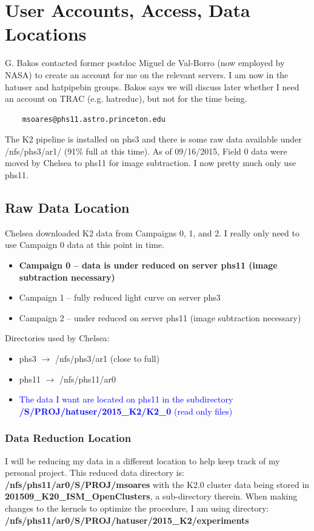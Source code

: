\documentclass[11pt,letterpaper]{book} %
\begin{document}
\chapter*{User Accounts, Access, Data Locations}
G. Bakos contacted former postdoc Miguel de Val-Borro (now employed by NASA) to create an account for me on the relevant servers. I am now in the hatuser and hatpipebin groups. Bakos says we will discuss later whether I need an account on TRAC (e.g. hatreduc), but not for the time being.

\begin{verbatim}
    msoares@phs11.astro.princeton.edu
\end{verbatim}

The K2 pipeline is installed on phs3 and there is some raw data available under /nfs/phs3/ar1/ (91\% full at this time). As of 09/16/2015, Field 0 data were moved by Chelsea to phs11 for image subtraction. I now pretty much only use phs11.

\section*{Raw Data Location}
Chelsea downloaded K2 data from Campaigns 0, 1, and 2. I really only need to use Campaign 0 data at this point in time.
\begin{itemize}
\item \textbf{Campaign 0 -- data is under reduced on server phs11 (image subtraction necessary)}
\item Campaign 1 -- fully reduced light curve on server phs3 
\item Campaign 2 -- under reduced on server phs11 (image subtraction necessary)
\end{itemize}

Directories used by Chelsea:
\begin{itemize}
\item  phs3 $\rightarrow$ /nfs/phs3/ar1 (close to full)
\item phs11 $\rightarrow$ /nfs/phs11/ar0
\item \textcolor{blue}{The data I want are located on phs11 in the subdirectory\\ \textbf{/S/PROJ/hatuser/2015\_K2/K2\_0} (read only files)}
\end{itemize}

\subsection*{Data Reduction Location}
I will be reducing my data in a different location to help keep track of my personal project. This reduced data directory is: \textbf{/nfs/phs11/ar0/S/PROJ/msoares} with the K2.0 cluster data being stored in \\ \textbf{201509\_K20\_ISM\_OpenClusters}, a sub-directory therein. 
When making changes to the kernels to optimize the procedure, I am using directory: \\
\textbf{/nfs/phs11/ar0/S/PROJ/hatuser/2015\_K2/experiments}
\end{document}

